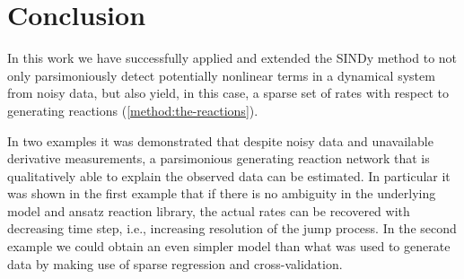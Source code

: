 \documentclass[oneside, abstracton, titlepage]{scrartcl}
\begin{document}
	\section{Conclusion}
	In this work we have successfully applied and extended the SINDy method to not only parsimoniously detect potentially nonlinear terms in a dynamical system from noisy data, but also yield, in this case, a sparse set of rates with respect to generating reactions (\ref{method:the-reactions}).

	In two examples it was demonstrated that despite noisy data and unavailable derivative measurements, a parsimonious generating reaction network that is qualitatively able to explain the observed data can be estimated.
	In particular it was shown in the first example that if there is no ambiguity in the underlying model and ansatz reaction library, the actual rates can be recovered with decreasing time step, i.e., increasing resolution of the jump process.
	In the second example we could obtain an even simpler model than what was used to generate data by making use of sparse regression and cross-validation.

	\newpage
% 	
	
	
	
\end{document}
